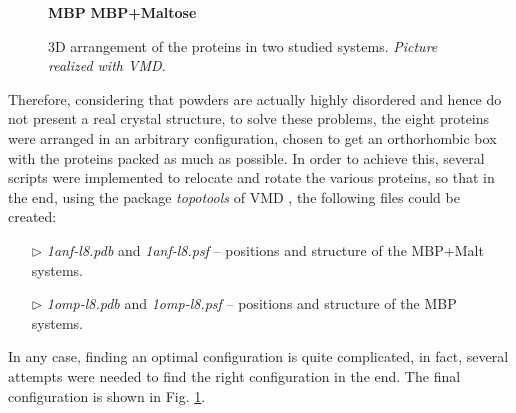 \begin{itemize}
\begin{figure}[h]
\begin{center}
\hspace{1.5cm}
\textbf{MBP}
\hspace{4.75cm}
\textbf{MBP+Maltose}

    \footnotesize{\caption{3D arrangement of the proteins in two studied systems. \textit{Picture realized with VMD.}}
    \label{fig:protein-box}
    }
\end{center}
\end{figure}

Therefore, considering that powders are actually highly disordered and hence do not present a real crystal structure, to solve these problems, the eight proteins were arranged in an arbitrary configuration, chosen to get an orthorhombic box with the proteins packed as much as possible. In order to achieve this, several scripts were implemented to relocate and rotate the various proteins, so that in the end, using the package \textit{topotools} of VMD \cite{vmd-topotools}, the following files could be created:
\begin{itemize}
\item[$\triangleright$] \textit{1anf-l8.pdb} and \textit{1anf-l8.psf} -- positions and structure of the MBP+Malt systems.
\item[$\triangleright$] \textit{1omp-l8.pdb} and \textit{1omp-l8.psf} -- positions and structure of the MBP systems.
\end{itemize}
In any case, finding an optimal configuration is quite complicated, in fact, several attempts were needed to find the right configuration in the end. The final configuration is shown in Fig. \ref{fig:protein-box}.


\end{itemize}
